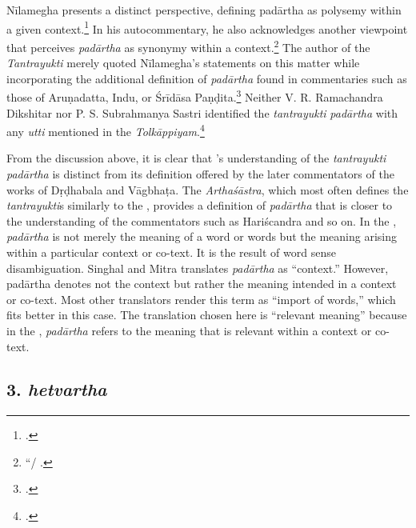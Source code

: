 Nīlamegha presents a distinct perspective, 
defining padārtha as polysemy within a given context.\footnote{
\cite[4][4]{muth-1976}.} 
In his autocommentary, he also acknowledges another viewpoint 
that perceives \emph{padārtha} as synonymy within a context.\footnote{
	 “/
	\cite[5]{muth-1976}.} 
The author of the \emph{Tantrayukti} merely quoted Nīlamegha's statements on 
this matter 
while incorporating the additional definition of \emph{padārtha} 
found in commentaries such as those of Aruṇadatta, Indu, or Śrīdāsa 
Paṇḍita.\footnote{
	\begin{verse}
	\end{verse}
	\cite[8--10]{nara-1949}.}
Neither V. R. Ramachandra Dikshitar nor P. S. Subrahmanya Sastri 
identified the \emph{tantrayukti} \emph{padārtha} with any \emph{utti} 
mentioned in the \emph{Tolkāppiyam}.\footcite[84]{chev-2009}

From the discussion above, it is clear that \SS 's understanding 
of the \emph{tantrayukti} \emph{padārtha} is distinct from its definition 
offered by the later commentators of the works of Dṛḍhabala and Vāgbhaṭa. 
The \emph{Arthaśāstra}, 
which most often defines the \emph{tantrayukti}s similarly to the \SS, 
provides a definition of \emph{padārtha} that is closer 
to the understanding of the commentators such as Hariścandra and so on. 
In the \SS, \emph{padārtha} is not merely the meaning of a word or words 
but the meaning arising within a particular context or co-text. 
It is the result of word sense disambiguation. 
Singhal and Mitra translates \emph{padārtha} as “context.” 
However, padārtha denotes not the context but rather the meaning intended in a 
context or co-text. 
Most other translators render this term as “import of words,” 
which fits better in this case. 
The translation chosen here is “relevant meaning” 
because in the \SS, \emph{padārtha} refers to the meaning 
that is relevant within a context or co-text.

\subsection{3. \emph{hetvartha}}

